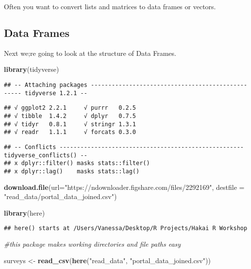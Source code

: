 \documentclass[]{article}
\newenvironment{Shaded}{\begin{snugshade}}{\end{snugshade}}
\newcommand{\KeywordTok}[1]{\textcolor[rgb]{0.13,0.29,0.53}{\textbf{#1}}}
\newcommand{\DataTypeTok}[1]{\textcolor[rgb]{0.13,0.29,0.53}{#1}}
\newcommand{\StringTok}[1]{\textcolor[rgb]{0.31,0.60,0.02}{#1}}
\newcommand{\CommentTok}[1]{\textcolor[rgb]{0.56,0.35,0.01}{\textit{#1}}}
\newcommand{\NormalTok}[1]{#1}
\begin{document}
Often you want to convert lists and matrices to data frames or vectors.

\subsection{Data Frames}\label{data-frames}

Next we;re going to look at the structure of Data Frames.

\begin{Shaded}
\begin{Highlighting}[]
\KeywordTok{library}\NormalTok{(tidyverse)}
\end{Highlighting}
\end{Shaded}

\begin{verbatim}
## -- Attaching packages -------------------------------------------------- tidyverse 1.2.1 --
\end{verbatim}

\begin{verbatim}
## √ ggplot2 2.2.1     √ purrr   0.2.5
## √ tibble  1.4.2     √ dplyr   0.7.5
## √ tidyr   0.8.1     √ stringr 1.3.1
## √ readr   1.1.1     √ forcats 0.3.0
\end{verbatim}

\begin{verbatim}
## -- Conflicts ----------------------------------------------------- tidyverse_conflicts() --
## x dplyr::filter() masks stats::filter()
## x dplyr::lag()    masks stats::lag()
\end{verbatim}

\begin{Shaded}
\begin{Highlighting}[]
\KeywordTok{download.file}\NormalTok{(}\DataTypeTok{url=}\StringTok{"https://ndownloader.figshare.com/files/2292169"}\NormalTok{, }\DataTypeTok{destfile =} \StringTok{"read_data/portal_data_joined.csv"}\NormalTok{)}

\KeywordTok{library}\NormalTok{(here)}
\end{Highlighting}
\end{Shaded}

\begin{verbatim}
## here() starts at /Users/Vanessa/Desktop/R Projects/Hakai R Workshop
\end{verbatim}

\begin{Shaded}
\begin{Highlighting}[]
\CommentTok{#this package makes working directories and file paths easy}

\NormalTok{surveys <-}\StringTok{ }\KeywordTok{read_csv}\NormalTok{(}\KeywordTok{here}\NormalTok{(}\StringTok{"read_data"}\NormalTok{, }\StringTok{"portal_data_joined.csv"}\NormalTok{))}
\end{Highlighting}
\end{Shaded}
\end{document}

